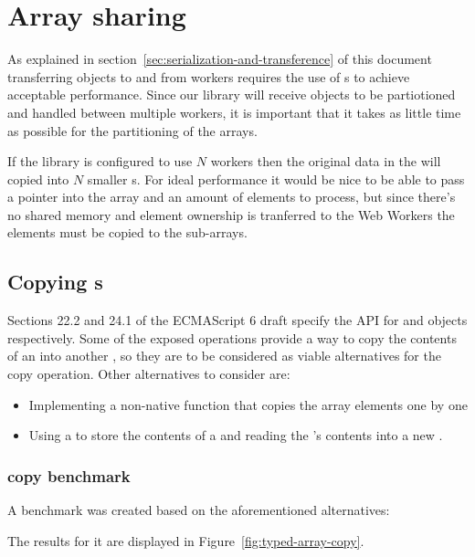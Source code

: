 \section{Array sharing}

As explained in section~\ref{sec:serialization-and-transference} of this document transferring \ttarray{} objects to and from workers requires the use of s to achieve acceptable performance. Since our library will receive \ttarray{} objects to be partiotioned and handled between multiple workers, it is important that it takes as little time as possible for the partitioning of the arrays.

If the library is configured to use \(N\) workers then the original data in the \ttarray{} will copied into \(N\) smaller \ttarray{}s. For ideal performance it would be nice to be able to pass a pointer into the array and an amount of elements to process, but since there's no shared memory and element ownership is tranferred to the Web Workers the elements must be copied to the sub-arrays.

\subsection{Copying \ttarray{}s}
\label{subsec:copying-typed-arrays}
Sections 22.2 and 24.1 of the ECMAScript 6 draft \cite{es6} specify the API for \ttarray{} and \tabuffer{} objects respectively. Some of the exposed operations provide a way to copy the contents of an \tabuffer{} into another \tabuffer{}, so they are to be considered as viable alternatives for the copy operation. Other alternatives to consider are:
\begin{itemize}
  \item Implementing a non-native function that copies the array elements one by one
  \item Using a  to store the contents of a \ttarray{} and reading the 's contents into a new \ttarray{}.
\end{itemize}

\subsubsection{\ttarray{} copy benchmark}
A benchmark was created based on the aforementioned alternatives:

The results for it are displayed in Figure~\ref{fig:typed-array-copy}.

